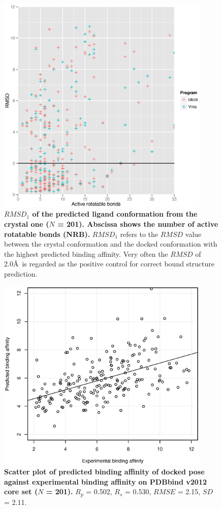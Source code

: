 \documentclass[10pt]{article}
\begin{document}
\begin{figure}[!ht]
\begin{center}
\includegraphics[width=4in]{NRB-RMSD.eps}
\end{center}
\caption{
{\bf $RMSD_1$ of the predicted ligand conformation from the crystal one ($N$ = 201). Abscissa shows the number of active rotatable bonds (NRB).} $RMSD_1$ refers to the $RMSD$ value between the crystal conformation and the docked conformation with the highest predicted binding affinity. Very often the $RMSD$ of 2.0\AA\ is regarded as the positive control for correct bound structure prediction.
}
\label{NRB-RMSD}
\end{figure}

\begin{figure}[!ht]
\begin{center}
\includegraphics[width=4in]{pK-idockConf1idock.eps}
\end{center}
\caption{
{\bf Scatter plot of predicted binding affinity of docked pose against experimental binding affinity on PDBbind v2012 core set ($N$ = 201).} $R_p$ = 0.502, $R_s$ = 0.530, $RMSE$ = 2.15, $SD$ = 2.11.
}
\label{pK-idockConf1idock}
\end{figure}
\end{document}
